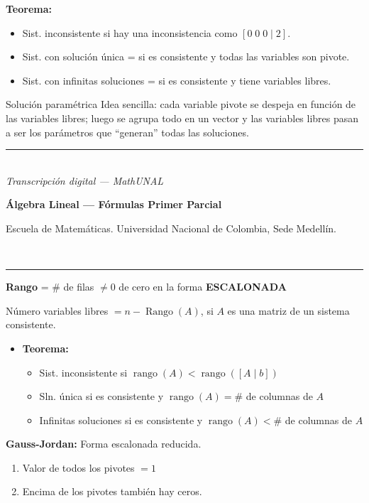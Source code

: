 \documentclass[11pt]{article}
\newcommand{\examheader}{%
  \noindent
  \begin{minipage}[t]{0.6\linewidth}
    {\small\bfseries Álgebra Lineal --- Fórmulas Primer Parcial}\\
  \end{minipage}%
  \hfill
  \begin{minipage}[t]{0.35\linewidth}
    \raggedleft\small Escuela de Matemáticas. Universidad Nacional de Colombia, Sede Medellín.
  \end{minipage}\\[2pt]
  \rule{\linewidth}{0.6pt}
}
\newcommand{\examfooter}{%
  \vfill
  \rule{\linewidth}{0.4pt}\\[1pt]
  {\scriptsize\textit{Transcripción digital --- MathUNAL}\hfill\textcolor{unalblue}{\textbf{\thepage}}}
}
\begin{document}
\vspace{0.2cm}
{\bfseries\color{purple1} Teorema:}
\begin{itemize}[leftmargin=1.2em]
\item Sist. inconsistente si hay una inconsistencia como $[0\;0\;0 \mid 2]$.
\item Sist. con solución única = si es consistente y todas las variables son pivote.
\item Sist. con infinitas soluciones = si es consistente y tiene variables libres.
\end{itemize}

\vspace{0.2cm}
\begin{formulabox4}{Solución paramétrica}
Idea sencilla: cada variable pivote se despeja en función de las variables libres; luego se agrupa todo en un vector y las variables libres pasan a ser los parámetros que ``generan'' todas las soluciones.
\end{formulabox4}

\examfooter
\newpage

\examheader

{\bfseries\color{purple1} Rango} = \# de filas $\neq 0$ de cero en la forma \textbf{ESCALONADA}

Número variables libres $= n - \operatorname{Rango}(A)$, si $A$ es una matriz de un sistema consistente.

\vspace{0.2cm}
\begin{itemize}[leftmargin=1.2em]
\item \textbf{Teorema:}
\begin{itemize}
\item Sist. inconsistente si $\operatorname{rango}(A) < \operatorname{rango}([A\mid b])$
\item Sln. única si es consistente y $\operatorname{rango}(A) = \#$ de columnas de $A$
\item Infinitas soluciones si es consistente y $\operatorname{rango}(A) < \#$ de columnas de $A$
\end{itemize}
\end{itemize}

\vspace{0.2cm}
{\bfseries\color{magenta1} Gauss-Jordan:} Forma escalonada reducida.
\begin{enumerate}
\item Valor de todos los pivotes $=1$
\item Encima de los pivotes también hay ceros.
\end{enumerate}
\end{document}

